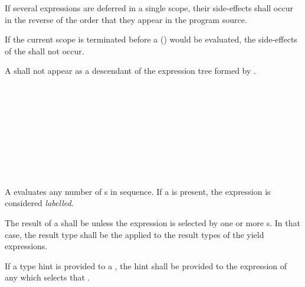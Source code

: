 \specsubsubitem
If several expressions are deferred in a single scope, their side-effects shall
occur in the reverse of the order that they appear in the program source.

\specsubsubitem
If the current scope is terminated before a 
() would be
evaluated, the side-effects of the  shall not occur.

\specsubsubitem
A  shall not appear as a descendant of the
expression tree formed by .


\begin{grammar}
 \\
	 \terminal{;}  \\
	 \terminal{;}  \\
	 \terminal{;}  \\

 \\
	 \terminal{\{}  \terminal{\}} \\

 \\
	\terminal{:}  \\
\end{grammar}

\specsubsubitem
A  evaluates any number of
s in sequence. If a  is present, the
expression is considered \textit{labelled}.

\specsubsubitem
The result of a  shall be 
unless the expression is selected by one or more
s. In that case, the result type shall be the
 applied to the result types of the
yield expressions.

\specsubsubitem
If a type hint is provided to a , the hint shall
be provided to the expression of any  which
selects that .

